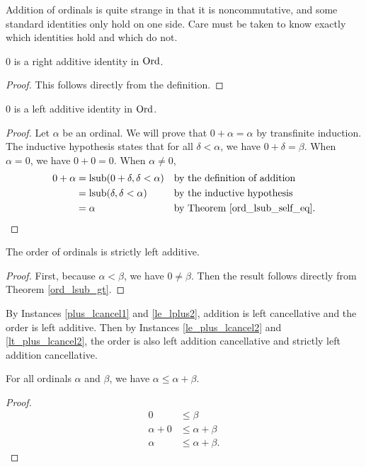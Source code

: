 \documentclass[../../math.tex]{subfiles}
\begin{document}
Addition of ordinals is quite strange in that it is noncommutative, and some
standard identities only hold on one side.  Care must be taken to know exactly
which identities hold and which do not.

\begin{instance}
    $0$ is a right additive identity in $\operatorname{Ord}$.
\end{instance}
\begin{proof}
    This follows directly from the definition.
\end{proof}

\begin{instance}
    $0$ is a left additive identity in $\operatorname{Ord}$.
\end{instance}
\begin{proof}
    Let $\alpha$ be an ordinal.  We will prove that $0 + \alpha = \alpha$ by
    transfinite induction.  The inductive hypothesis states that for all $\delta
    < \alpha$, we have $0 + \delta = \beta$.  When $\alpha = 0$, we have $0 + 0 =
    0$.  When $\alpha \neq 0$,
    \begin{align*}
        0 + \alpha
        &= \operatorname{lsub}(0 + \delta, \delta < \alpha)
            && \text{by the definition of addition} \\
        &= \operatorname{lsub}(\delta, \delta < \alpha)
            && \text{by the inductive hypothesis} \\
        &= \alpha
            && \text{by Theorem \ref{ord_lsub_self_eq}.} \\
    \end{align*}
\end{proof}

\begin{instance}
    The order of ordinals is strictly left additive.
\end{instance}
\begin{proof}
    First, because $\alpha < \beta$, we have $0 \neq \beta$.  Then the result
    follows directly from Theorem \ref{ord_lsub_gt}.
\end{proof}

By Instances \ref{plus_lcancel1} and \ref{le_lplus2}, addition is left
cancellative and the order is left additive.  Then by Instances
\ref{le_plus_lcancel2} and \ref{lt_plus_lcancel2}, the order is also left
addition cancellative and strictly left addition cancellative.

\begin{theorem} \label{ord_le_self_rplus}
    For all ordinals $\alpha$ and $\beta$, we have $\alpha \leq \alpha + \beta$.
\end{theorem}
\begin{proof}
    \begin{align*}
        0 & \leq \beta \\
        \alpha + 0 &\leq \alpha + \beta \\
        \alpha &\leq \alpha + \beta.
    \end{align*}
\end{proof}
\end{document}
